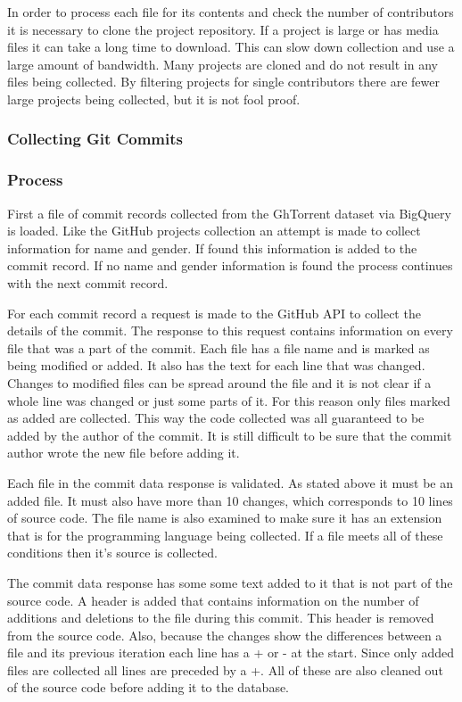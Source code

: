 \documentclass[12pt]{article}
\begin{document}
In order to process each file for its contents and check the number of contributors it is necessary to clone the project repository. If a project is large or has media files it can take a long time to download. This can slow down collection and use a large amount of bandwidth. Many projects are cloned and do not result in any files being collected. By filtering projects for single contributors there are fewer large projects being collected, but it is not fool proof.


\subsubsection{Collecting Git Commits}

\subsubsection*{Process}
First a file of commit records collected from the GhTorrent dataset via BigQuery is loaded. Like the GitHub projects collection an attempt is made to collect information for name and gender. If found this information is added to the commit record. If no name and gender information is found the process continues with the next commit record.

For each commit record a request is made to the GitHub API to collect the details of the commit. The response to this request contains information on every file that was a part of the commit. Each file has a file name and is marked as being modified or added. It also has the text for each line that was changed. Changes to modified files can be spread around the file and it is not clear if a whole line was changed or just some parts of it. For this reason only files marked as added are collected. This way the code collected was all guaranteed to be added by the author of the commit. It is still difficult to be sure that the commit author wrote the new file before adding it.

Each file in the commit data response is validated. As stated above it must be an added file. It must also have more than 10 changes, which corresponds to 10 lines of source code. The file name is also examined to make sure it has an extension that is for the programming language being collected. If a file meets all of these conditions then it's source is collected.

The commit data response has some some text added to it that is not part of the source code. A header is added that contains information on the number of additions and deletions to the file during this commit. This header is removed from the source code. Also, because the changes show the differences between a file and its previous iteration each line has a + or - at the start. Since only added files are collected all lines are preceded by a +. All of these are also cleaned out of the source code before adding it to the database.
\end{document}

